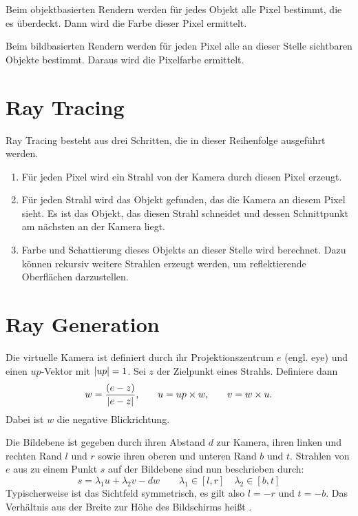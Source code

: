 Beim objektbasierten Rendern werden für jedes Objekt alle Pixel bestimmt, die es überdeckt.
Dann wird die Farbe dieser Pixel ermittelt.

Beim bildbasierten Rendern werden für jeden Pixel alle an dieser Stelle sichtbaren Objekte bestimmt.
Daraus wird die Pixelfarbe ermittelt.

\section{Ray Tracing}
Ray Tracing besteht aus drei Schritten, die in dieser Reihenfolge ausgeführt werden.
\begin{enumerate}
	\item {} Für jeden Pixel wird ein Strahl von der Kamera durch diesen Pixel erzeugt.
	\item {} Für jeden Strahl wird das Objekt gefunden, das die Kamera an diesem Pixel sieht.
	Es ist das Objekt, das diesen Strahl schneidet und dessen Schnittpunkt am nächsten an der Kamera liegt.
	\item {} Farbe und Schattierung dieses Objekts an dieser Stelle wird berechnet.
	Dazu können rekursiv weitere Strahlen erzeugt werden, um \zB reflektierende Oberflächen darzustellen.
\end{enumerate}

\section{Ray Generation}
Die virtuelle Kamera ist definiert durch ihr Projektionszentrum $e$ (engl. eye) und einen $up$-Vektor mit $\vert up \vert = 1$.
Sei $z$ der Zielpunkt eines Strahls.
Definiere dann
\[
	w = \frac{(e - z)}{\vert e - z \vert} \text{,} \qquad
	u = up \times w \text {,} \qquad
	v = w \times u \text{.}
\]
Dabei ist $w$ die negative Blickrichtung.

Die Bildebene ist gegeben durch ihren Abstand $d$ zur Kamera, ihren linken und rechten Rand $l$ und $r$ sowie ihren oberen und unteren Rand $b$ und $t$.
Strahlen von $e$ aus zu einem Punkt $s$ auf der Bildebene sind nun beschrieben durch:
\[
	s = \lambda_1 u + \lambda_2 v - dw \qquad \lambda_1 \in [l, r] \quad \lambda_2 \in [b, t] 
\]
Typischerweise ist das Sichtfeld symmetrisch, es gilt also $l = -r$ und $t = -b$.
Das Verhältnis aus der Breite zur Höhe des Bildschirms heißt .

